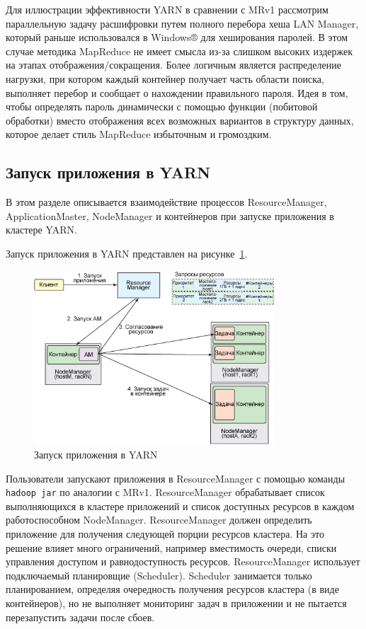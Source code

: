 Для иллюстрации эффективности YARN в сравнении с MRv1 рассмотрим параллельную задачу расшифровки путем полного перебора хеша LAN Manager, который раньше использовался в Windows® для хеширования паролей. В этом случае методика MapReduce не имеет смысла из-за слишком высоких издержек на этапах отображения/сокращения. Более логичным является распределение нагрузки, при котором каждый контейнер получает часть области поиска, выполняет перебор и сообщает о нахождении правильного пароля. Идея в том, чтобы определять пароль динамически с помощью функции (побитовой обработки) вместо отображения всех возможных вариантов в структуру данных, которое делает стиль MapReduce избыточным и громоздким.

\subsection{Запуск приложения в YARN}
В этом разделе описывается взаимодействие процессов ResourceManager, ApplicationMaster, NodeManager и контейнеров при запуске приложения в кластере YARN.

Запуск приложения в YARN представлен на рисунке~\ref{fig:yarn_sample}.

\begin{figure}[H]
    \centering
    \includegraphics[width=0.8\textwidth]{yarn_sample}
    \caption{Запуск приложения в YARN}
    \label{fig:yarn_sample}
\end{figure}

Пользователи запускают приложения в ResourceManager с помощью команды \texttt{hadoop jar} по аналогии с MRv1. ResourceManager обрабатывает список выполняющихся в кластере приложений и список доступных ресурсов в каждом работоспособном NodeManager. ResourceManager должен определить приложение для получения следующей порции ресурсов кластера. На это решение влияет много ограничений, например вместимость очереди, списки управления доступом и равнодоступность ресурсов. ResourceManager использует подключаемый планировщие (Scheduler). Scheduler занимается только планированием, определяя очередность получения ресурсов кластера (в виде контейнеров), но не выполняет мониторинг задач в приложении и не пытается перезапустить задачи после сбоев.

